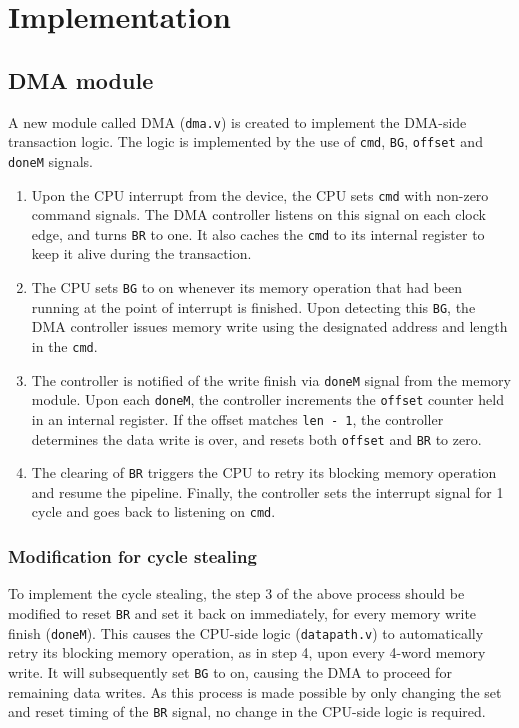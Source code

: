 \documentclass[12pt]{article}
\begin{document}
\section{Implementation}

\subsection{DMA module}
A new module called DMA (\verb|dma.v|) is created to implement the
DMA-side transaction logic.  The logic is implemented by the use of
\verb|cmd|, \verb|BG|, \verb|offset| and \verb|doneM| signals.

\begin{enumerate}
\item Upon the CPU interrupt from the device, the CPU sets \verb|cmd|
  with non-zero command signals. The DMA controller listens on this
  signal on each clock edge, and turns \verb|BR| to one.  It also
  caches the \verb|cmd| to its internal register to keep it alive
  during the transaction.
\item The CPU sets \verb|BG| to on whenever its memory operation that
  had been running at the point of interrupt is finished.  Upon detecting
  this \verb|BG|, the DMA
  controller issues memory write using the designated address and length
  in the \verb|cmd|.
\item The controller is notified of the write finish via \verb|doneM|
  signal from the memory module.  Upon each \verb|doneM|, the
  controller increments the \verb|offset| counter held in an internal
  register.  If the offset matches \verb|len - 1|, the controller
  determines the data write is over, and resets both \verb|offset| and
  \verb|BR| to zero.
\item The clearing of \verb|BR| triggers the CPU to retry its blocking
  memory operation and resume the pipeline.  Finally, the controller
  sets the interrupt signal for 1 cycle and goes back to listening on
  \verb|cmd|.
\end{enumerate}

\subsubsection{Modification for cycle stealing}
To implement the cycle stealing, the step 3 of the above process
should be modified to reset \verb|BR| and set it back on immediately,
for every memory write finish (\verb|doneM|).  This causes the
CPU-side logic (\verb|datapath.v|) to automatically retry its blocking
memory operation, as in step 4, upon every 4-word memory write.  It
will subsequently set \verb|BG| to on, causing the DMA to proceed for
remaining data writes.  As this process is made possible by only
changing the set and reset timing of the \verb|BR| signal, no change
in the CPU-side logic is required.
\end{document}
